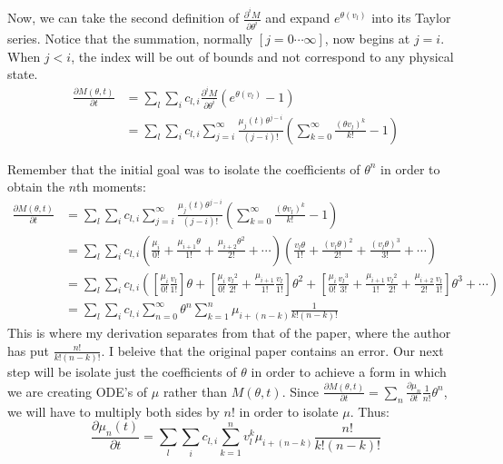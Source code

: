 \documentclass[a4paper,10pt]{article}
\begin{document}
Now, we can take the second definition of $\frac{\partial ^i M}{\partial \theta^i}$ and expand $e^{\theta (v_l)}$ into its Taylor series. Notice that the summation, normally $\left[j=0\cdots \infty\right]$, now begins at $j=i$. When $j<i$, the index will be out of bounds and not correspond to any physical state.
\begin{align*}
 \frac{\partial M(\theta, t)}{\partial t} &= \sum_l \sum_i c_{l,i} \frac{\partial ^i M}{\partial \theta^i} \left(e^{\theta (v_l)}-1\right)\\
 &= \sum_l \sum_i c_{l,i} \sum_{j=i}^\infty \frac{\mu_j(t)\theta^{j-i}}{(j-i)!}\left(\sum_{k=0}^\infty \frac{{(\theta v_l)}^k}{k!}-1\right)
\end{align*}

Remember that the initial goal was to isolate the coefficients of $\theta^n$ in order to obtain the $n$th moments:
\begin{align*}
 \frac{\partial M(\theta, t)}{\partial t} &= \sum_l \sum_i c_{l,i} \sum_{j=i}^\infty \frac{\mu_j(t)\theta^{j-i}}{(j-i)!} \left( \sum_{k=0}^\infty \frac{{(\theta v_l)}^k}{k!}-1 \right)\\
&= \sum_l \sum_i c_{l,i} \left( \frac{\mu_i}{0!}+\frac{\mu_{i+1}\theta}{1!}+\frac{\mu_{i+2}\theta^2}{2!}+\cdots \right) \left(\frac{v_l \theta}{1!}+\frac{{(v_l \theta)}^2}{2!}+\frac{{(v_l \theta)}^3}{3!}+\cdots\right)\\
 &= \sum_l \sum_i c_{l,i} \left( \left[\frac{\mu_i}{0!}\frac{v_l}{1!}\right]\theta+\left[\frac{\mu_{i}}{0!}\frac{{v_l}^2}{2!}+\frac{\mu_{i+1}}{1!}\frac{{v_l}}{1!}\right]\theta^2+\left[\frac{\mu_{i}}{0!}\frac{{v_l}^3}{3!}+\frac{\mu_{i+1}}{1!}\frac{{v_l}^2}{2!}+\frac{\mu_{i+2}}{2!}\frac{{v_l}}{1!}\right]\theta^3+\cdots\right)\\
  &=\sum_l \sum_i c_{l,i} \sum_{n=0}^\infty \theta^n \sum_{k=1}^n \mu_{i+(n-k)} \frac{1}{k!(n-k)!}
\end{align*}
This is where my derivation separates from that of the paper, where the author has put $\frac{n!}{k!(n-k)!}$. I beleive that the original paper contains an error. Our next step will be isolate just the coefficients of $\theta$ in order to achieve a form in which we are creating ODE's of $\mu$ rather than $M(\theta, t)$. Since $\frac{\partial M(\theta, t)}{\partial t}=\sum_n \frac{\partial \mu_n}{\partial t}\frac{1}{n!}\theta^n$, 
 we will have to multiply both sides by $n!$ in order to isolate $\mu$. Thus:
  $$ \frac{\partial \mu_n(t)}{\partial t}=\sum_l \sum_i c_{l,i} \sum_{k=1}^n v_l^k \mu_{i+(n-k)} \frac{n!}{k!(n-k)!}$$
\end{document}
